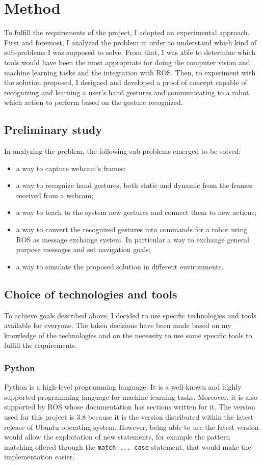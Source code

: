 \documentclass[../thesis.tex]{subfiles}
\begin{document}
\chapter{Method}\label{cap:methods}
To fulfill the requirements of the project, I adopted an experimental approach. First and foremost, I analyzed the problem in order to understand which kind of sub-problems I was supposed to solve. From that, I was able to determine which tools would have been the most appropriate for doing the computer vision and machine learning tasks and the integration with \gls{ROS}. Then, to experiment with the solution proposed, I designed and developed a proof of concept capable of recognizing and learning a user’s hand gestures and communicating to a robot which action to perform based on the gesture recognized.\\

\section{Preliminary study}
In analyzing the problem, the following sub-problems emerged to be solved:
\begin{itemize}
    \item a way to capture webcam's frames;
    \item a way to recognize hand gestures, both static and dynamic from the frames received from a webcam;
    \item a way to teach to the system new gestures and connect them to new actions;
    \item a way to convert the recognized gestures into commands for a robot using \gls{ROS} as message exchange system. In particular a way to exchange general purpose messages and set navigation goals;
    \item a way to simulate the proposed solution in different environments.
\end{itemize}

\section{Choice of technologies and tools}\label{sec:technologies_and_tolls}
To achieve goals described above, I decided to use specific technologies and tools available for everyone. The taken decisions have been made based on my knowledge of the technologies and on the necessity to use some specific tools to fulfill the requirements.
\subsection{Python}
Python is a high-level programming language. It is a well-known and highly supported programming language for machine learning tasks. Moreover, it is also supported by \acrshort{ROS} whose documentation has sections written for it. The version used for this project is 3.8 because it is the version distributed within the latest release of Ubuntu operating system. However, being able to use the latest version would allow the exploitation of new statements, for example the pattern matching offered through the \texttt{match ... case} statement, that would make the implementation easier.
\end{document}
